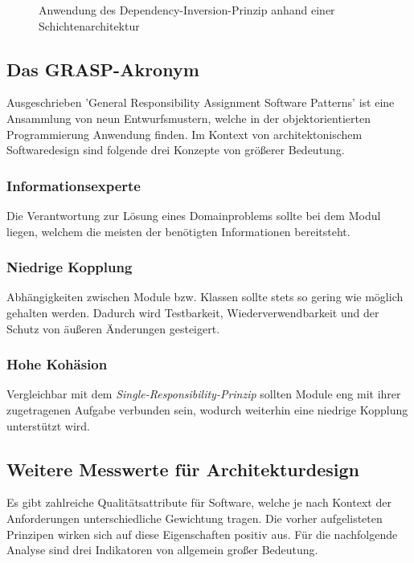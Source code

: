 \documentclass[conference]{IEEEtran}
\begin{document}
\begin{figure}[htbp]
	\small
	
	\caption{Anwendung des Dependency-Inversion-Prinzip anhand einer Schichtenarchitektur}
	\label{fig:NachDIP}
\end{figure}



\subsection{Das GRASP-Akronym} Ausgeschrieben 'General Responsibility Assignment Software Patterns' ist eine Ansammlung von neun Entwurfsmustern, welche in der objektorientierten Programmierung Anwendung finden. Im Kontext von architektonischem Softwaredesign sind folgende drei Konzepte von größerer Bedeutung.

\subsubsection{Informationsexperte} Die Verantwortung zur Lösung eines Domainproblems sollte bei dem Modul liegen, welchem die meisten der benötigten Informationen bereitsteht.

\subsubsection{Niedrige Kopplung} Abhängigkeiten zwischen Module bzw. Klassen sollte stets so gering wie möglich gehalten werden. Dadurch wird Testbarkeit, Wiederverwendbarkeit und der Schutz von äußeren Änderungen gesteigert.

\subsubsection{Hohe Kohäsion} Vergleichbar mit dem \emph{Single-Responsibility-Prinzip} sollten Module eng mit ihrer zugetragenen Aufgabe verbunden sein, wodurch weiterhin eine niedrige Kopplung unterstützt wird.



\subsection{Weitere Messwerte für Architekturdesign} Es gibt zahlreiche Qualitätsattribute für Software, welche je nach Kontext der Anforderungen unterschiedliche Gewichtung tragen. Die vorher aufgelisteten Prinzipen wirken sich auf diese Eigenschaften positiv aus. Für die nachfolgende Analyse sind drei Indikatoren von allgemein großer Bedeutung. 
\end{document}
